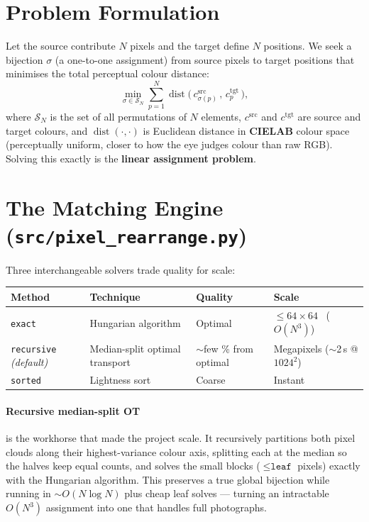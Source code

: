 \documentclass[11pt,a4paper]{article}
\begin{document}
\section{Problem Formulation}
Let the source contribute $N$ pixels and the target define $N$ positions. We seek a bijection
$\sigma$ (a one-to-one assignment) from source pixels to target positions that minimises the
total perceptual colour distance:
\begin{equation}
\min_{\sigma \in \mathcal{S}_N}
\sum_{p=1}^{N} \operatorname{dist}\!\big(\, c^{\text{src}}_{\sigma(p)} \,,\, c^{\text{tgt}}_{p} \,\big),
\end{equation}
where $\mathcal{S}_N$ is the set of all permutations of $N$ elements, $c^{\text{src}}$ and
$c^{\text{tgt}}$ are source and target colours, and $\operatorname{dist}(\cdot,\cdot)$ is
Euclidean distance in \textbf{CIELAB} colour space (perceptually uniform, closer to how the
eye judges colour than raw RGB). Solving this exactly is the \textbf{linear assignment
problem}.

\section{The Matching Engine (\texttt{src/pixel\_rearrange.py})}
Three interchangeable solvers trade quality for scale:

\begin{center}
\begin{tabular}{@{}llll@{}}
\toprule
\textbf{Method} & \textbf{Technique} & \textbf{Quality} & \textbf{Scale} \\
\midrule
\texttt{exact} & Hungarian algorithm & Optimal & $\le 64{\times}64$ \ ($O(N^3)$) \\
\texttt{recursive}\, \emph{(default)} & Median-split optimal transport & $\sim$few \% from optimal & Megapixels ($\sim$2\,s @ $1024^2$) \\
\texttt{sorted} & Lightness sort & Coarse & Instant \\
\bottomrule
\end{tabular}
\end{center}

\paragraph{Recursive median-split OT} is the workhorse that made the project scale. It
recursively partitions both pixel clouds along their highest-variance colour axis, splitting
each at the median so the halves keep equal counts, and solves the small blocks
($\le \texttt{leaf}$ pixels) exactly with the Hungarian algorithm. This preserves a true global
bijection while running in $\sim O(N \log N)$ plus cheap leaf solves --- turning an
intractable $O(N^3)$ assignment into one that handles full photographs.
\end{document}
